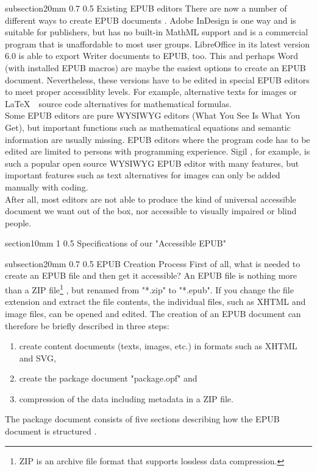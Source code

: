 \documentclass[12pt]{llncs}
\makeatletter
\renewcommand\section{\@startsection 
   {section}{1}{0mm}%
   {1\baselineskip}%
   {0.5\baselineskip}%
   {\bfseries\Large}%
   }
\renewcommand\subsection{\@startsection 
   {subsection}{2}{0mm}%
   {0.7\baselineskip}%
   {0.5\baselineskip}%
   {\bfseries\large}%
   }
\makeatother
\begin{document}
\subsection{Existing EPUB editors}
There are now a number of different ways to create EPUB documents \cite{EPUBprograms}. Adobe InDesign is one way and is suitable for publishers, but has no built-in MathML support and is a commercial program that is unaffordable to most user groups. LibreOffice in its latest version 6.0 is able to export Writer documents to EPUB, too. This and perhaps Word (with installed EPUB macros) are maybe the easiest options to create an EPUB document. Nevertheless, these versions have to be edited in special EPUB editors to meet proper accessiblity levels. For example, alternative texts for images or \LaTeX $\mbox{ }$ source code alternatives for mathematical formulas.\\
Some EPUB editors are pure WYSIWYG editors (What You See Is What You Get), but important functions such as mathematical equations and semantic information are usually missing. EPUB editors where the program code has to be edited are limited to persons with programming experience. Sigil \cite{Sigil}, for example, is such a popular open source WYSIWYG EPUB editor with many features, but important features such as text alternatives for images can only be added manually with coding.\\
After all, most editors are not able to produce the kind of universal accessible document we want out of the box, nor accessible to visually impaired or blind people. 

\section{Specifications of our "Accessible EPUB"}

\subsection{EPUB Creation Process}
First of all, what is needed to create an EPUB file and then get it accessible? An EPUB file is nothing more than a ZIP file\footnote{ZIP is an archive file format that supports lossless data compression.} \cite{WhatIsEpub3}, but renamed from "*.zip" to "*.epub". If you change the file extension and extract the file contents, the individual files, such as XHTML and image files, can be opened and edited. The creation of an EPUB document can therefore be briefly described in three steps: 
\begin{enumerate}
\item create content documents (texts, images, etc.) in formats such as XHTML and SVG, 
\item create the package document "package.opf" and 
\item compression of the data including metadata in a ZIP file.
\end{enumerate}
The package document consists of five sections describing how the EPUB document is structured \cite{EPUB3bp}.
\end{document}

